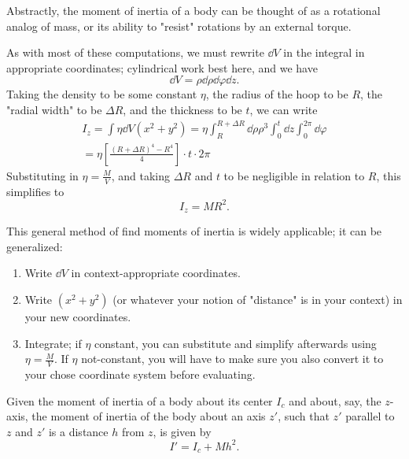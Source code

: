\documentclass[12pt]{article}
\begin{document}
Abstractly, the moment of inertia of a body can be thought of as a rotational analog of mass, or its ability to "resist" rotations by an external torque.

\begin{example}
  As with most of these computations, we must rewrite $\dd{V}$ in the integral in appropriate coordinates; cylindrical work best here, and we have \[\dd{V} = \rho \dd{\rho} \dd{\varphi} \dd{z}.\]  
  Taking the density to be some constant $\eta$, the radius of the hoop to be $R$, the "radial width" to be $\Delta R$, and the thickness to be $t$, we can write \begin{align*}
    I_z = \int \eta \dd{V} (x^2 + y^2) = \eta \int_R^{R + \Delta R} \dd{\rho} \rho^3 \int_{0}^t \dd{z} \int_{0}^{2\pi} \dd{\varphi}\\
    = \eta \left[\frac{(R + \Delta R)^4 - R^4}{4}\right]\cdot t \cdot 2 \pi
  \end{align*}
 Substituting in $\eta = \frac{M}{V}$, and taking $\Delta R$ and $t$ to be negligible in relation to $R$, this simplifies to \[
 \boxed{I_z = MR^2}.
 \]
\end{example}
\begin{remark}
  This general method of find moments of inertia is widely applicable; it can be generalized:
  \begin{enumerate}
    \item Write $\dd{V}$ in context-appropriate coordinates.
    \item Write $(x^2 + y^2)$ (or whatever your notion of "distance" is in your context) in your new coordinates.
    \item Integrate; if $\eta$ constant, you can substitute and simplify afterwards using $\eta = \frac{M}{V}$. If $\eta$ not-constant, you will have to make sure you also convert it to your chose coordinate system before evaluating.
  \end{enumerate}
\end{remark}
\begin{theorem}
  Given the moment of inertia of a body about its center $I_c$ and about, say, the $z$-axis, the moment of inertia of the body about an axis $z'$, such that $z'$ parallel to $z$ and $z'$ is a distance $h$ from $z$, is given by \[
    I' = I_c + Mh^2.
  \]
\end{theorem}

\begin{theorem}
  
\end{theorem}
\end{document}
